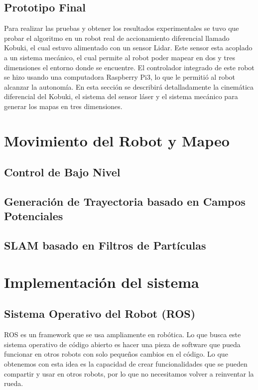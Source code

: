 \subsection{Prototipo Final}
Para realizar las pruebas y obtener los resultados experimentales se tuvo que probar
el algoritmo en un robot real de accionamiento diferencial llamado Kobuki, el cual estuvo 
alimentado con un sensor Lidar. Este sensor esta acoplado a un sistema mec\'anico, el cual
permite al robot poder mapear en dos y tres dimensiones el entorno donde se encuentre. El 
controlador integrado de este robot se hizo usando una computadora Raspberry Pi3, lo que le
permiti\'o al robot alcanzar la autonom\'ia. En esta secci\'on se describir\'a detalladamente
la cinem\'atica diferencial del Kobuki, el sistema del sensor l\'aser y el sistema mec\'anico 
para generar los mapas en tres dimensiones.

\section{Movimiento del Robot y Mapeo}

\subsection{Control de Bajo Nivel}

\subsection{Generaci\'on de Trayectoria basado en Campos Potenciales}

\subsection{SLAM basado en Filtros de Part\'iculas}

\section{Implementaci\'on del sistema}

\subsection{Sistema Operativo del Robot (ROS)}
ROS es un framework que se usa ampliamente en rob\'otica. Lo que busca 
este sistema operativo de código abierto es hacer una pieza de software 
que pueda funcionar en otros robots con solo pequeños cambios en el 
c\'odigo. Lo que obtenemos con esta idea es la capacidad de crear 
funcionalidades que se pueden compartir y usar en otros robots, por 
lo que no necesitamos volver a reinventar la rueda.

